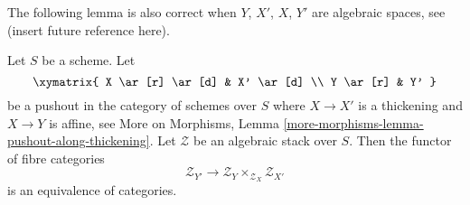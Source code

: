 \medskip\noindent
The following lemma is also correct when $Y$, $X'$, $X$, $Y'$ are
algebraic spaces, see (insert future reference here).

\begin{lemma}
\label{lemma-pushout}
Let $S$ be a scheme. Let
$$
\xymatrix{
X \ar[r] \ar[d] & X' \ar[d] \\
Y \ar[r] & Y'
}
$$
be a pushout in the category of schemes over $S$ where $X \to X'$
is a thickening and $X \to Y$ is affine, see
More on Morphisms, Lemma \ref{more-morphisms-lemma-pushout-along-thickening}.
Let $\mathcal{Z}$ be an algebraic stack over $S$.
Then the functor of fibre categories
$$
\mathcal{Z}_{Y'}
\longrightarrow
\mathcal{Z}_Y \times_{\mathcal{Z}_X} \mathcal{Z}_{X'}
$$
is an equivalence of categories.
\end{lemma}


